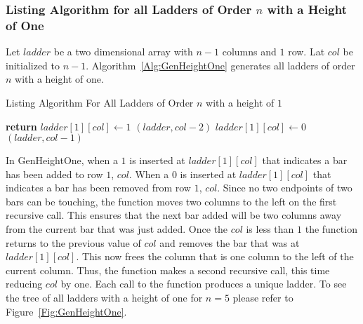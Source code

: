    \subsubsection{Listing Algorithm for all Ladders of Order $n$ with a Height of One}
   Let $ladder$ be a two dimensional array with $n-1$ columns and $1$ row.
   Lat $col$ be initialized to $n-1$. Algorithm~\ref{Alg:GenHeightOne} generates 
   all ladders of order $n$ with a height of one.
   \begin{algorithm}
        \caption{Listing Algorithm For All Ladders of Order $n$ with a height of $1$}
        \begin{algorithmic}[1]
                    \State \textbf{return}
                \EndIf
                \State $ladder[1][col] \gets 1$
                $(ladder, col-2)$
                \State $ladder[1][col] \gets 0$
                $(ladder, col-1)$


            \EndFunction
        \end{algorithmic}   
        \label{Alg:GenHeightOne} 
   \end{algorithm}

   In {\sc GenHeightOne}, when a $1$ is inserted at $ladder[1][col]$ that indicates a bar has been added to row $1$, $col$. When a $0$ is 
   inserted at $ladder[1][col]$ that indicates a bar has been removed from row $1$, $col$. Since no two endpoints of two bars can be touching, 
   the function moves two columns to the 
   left on the first recursive call. This ensures that the next bar added will be two columns away from the current bar that was just added. 
   Once the $col$ is less than $1$ the function returns to the previous value of $col$ and removes the bar that was at $ladder[1][col]$. 
   This now frees the column that is one column to the left of the current column. 
   Thus, the function makes a second recursive call, this time reducing $col$ by one. 
   Each call to the function produces a unique ladder. To see the tree of all ladders with a height of one for $n=5$ please refer to Figure~\ref{Fig:GenHeightOne}.\pagebreak

